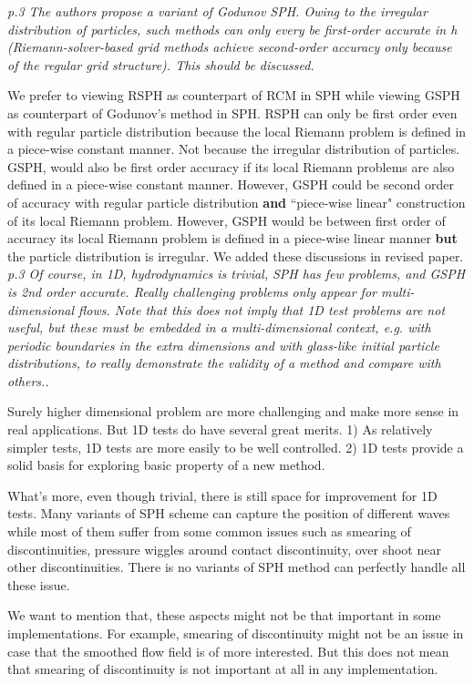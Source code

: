 \documentclass[10pt,a4paper]{article}
\begin{document}
\textit{p.3 The authors propose a variant of Godunov SPH. Owing to the irregular distribution of particles, such methods can only every be first-order accurate in h (Riemann-solver-based grid methods achieve second-order accuracy only because of the regular grid structure). This should be discussed.}

We prefer to viewing RSPH as counterpart of RCM in SPH while viewing GSPH as counterpart of Godunov's method in SPH. 
RSPH can only be first order even with regular particle distribution because the local Riemann problem is defined in a piece-wise constant manner. Not because the irregular distribution of particles. GSPH, would also be first order accuracy if its local Riemann problems are also defined in a piece-wise constant manner. However, GSPH could be second order of accuracy with regular particle distribution \textbf{and} ``piece-wise linear" construction of its local Riemann problem. However, GSPH would be between first order of accuracy its local Riemann problem is defined in a piece-wise linear manner \textbf{but} the particle distribution is irregular.
We added these discussions in revised paper.
\\[3pt]

\textit{p.3 Of course, in 1D, hydrodynamics is trivial, SPH has few problems, and
GSPH is 2nd order accurate. Really challenging problems only appear for multi-dimensional flows. Note that this does not imply that 1D test
problems are not useful, but these must be embedded in a multi-dimensional context, e.g. with periodic boundaries in the extra dimensions and with glass-like initial particle distributions, to really
demonstrate the validity of a method and compare with others..}

Surely higher dimensional problem are more challenging and make more sense in real applications. 
But 1D tests do have several great merits. 1) As relatively simpler tests, 1D tests are more easily to be well controlled. 2) 1D tests provide a solid basis for exploring basic property of a new method. 

What's more, even though trivial, there is still space for improvement for 1D tests. Many variants of SPH scheme can capture the position of different waves while most of them suffer from some common issues such as smearing of discontinuities, pressure wiggles around contact discontinuity, over shoot near other discontinuities. There is no variants of SPH method can perfectly handle all these issue. 

We want to mention that, these aspects might not be that important in some implementations. For example, smearing of discontinuity might not be an issue in case that the smoothed flow field is of more interested. But this does not mean that smearing of discontinuity is not important at all in any implementation.
\\[3pt]
\end{document}
